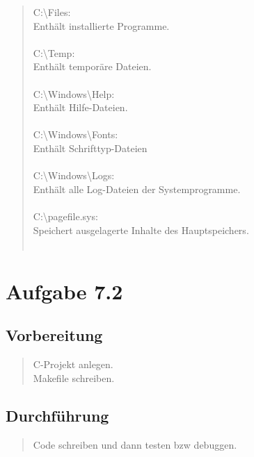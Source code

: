 \begin{quote}
			C:\textbackslash Files:\\
			Enth\"alt  installierte Programme.\\ \\
			C:\textbackslash Temp:\\
			Enth\"alt  tempor\"are Dateien.\\ \\
			C:\textbackslash Windows\textbackslash Help:\\
			Enth\"alt  Hilfe-Dateien.\\ \\
			C:\textbackslash Windows\textbackslash Fonts:\\
			Enth\"alt  Schrifttyp-Dateien\\ \\
			C:\textbackslash Windows\textbackslash Logs:\\
			Enth\"alt alle Log-Dateien der Systemprogramme.\\ \\
			C:\textbackslash pagefile.sys:\\
			Speichert ausgelagerte Inhalte des Hauptspeichers.\\ \\
		\end{quote}

\section{Aufgabe 7.2}
	\subsection{Vorbereitung}
		\begin{quote}
			C-Projekt anlegen.\\
			Makefile schreiben.\\
		\end{quote}
	\subsection{Durchführung}
		\begin{quote}
			Code schreiben und dann testen bzw debuggen.\\
		\end{quote}

